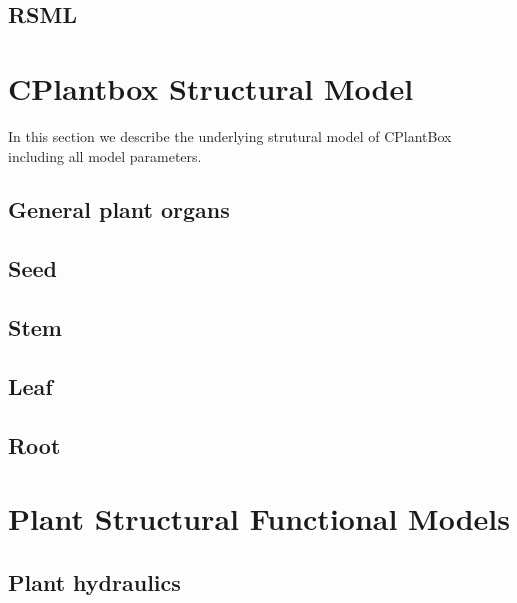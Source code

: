 \documentclass[a4paper]{article}
\begin{document}
\subsection{RSML} \label{ssec:rsml}
%




\newpage
\section{CPlantbox Structural Model} \label{sec:cplantobx}

In this section we describe the underlying strutural model of CPlantBox including all model parameters.

\subsection{General plant organs} \label{ssec:organs}


\subsection{Seed} \label{ssec:seed}


\subsection{Stem} \label{ssec:stem}


\subsection{Leaf} \label{ssec:leaf}


\subsection{Root} \label{ssec:root}





\newpage
\section{Plant Structural Functional Models} \label{sec:fspm}

\subsection{Plant hydraulics} \label{ssec:hydraulics}
% 
\end{document}
